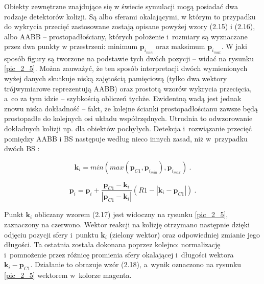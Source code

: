 				
				Obiekty zewnętrzne znajdujące się w świecie symulacji mogą posiadać dwa rodzaje detektorów kolizji. Są albo sferami okalającymi, w którym to przypadku do wykrycia przecięć zastosowane zostają opisane powyżej wzory (2.15) i (2.16), albo AABB -- prostopadłościany, których położenie i~rozmiary są wyznaczane przez dwa punkty w przestrzeni: minimum \(\mathbf{p}_{i_{min}}\) oraz maksimum \(\mathbf{p}_{i_{max}}\). W jaki sposób figury są tworzone na podstawie tych dwóch pozycji -- widać na rysunku \ref{pic_2_5}. Można zauważyć, że ten sposób interpretacji dwóch wymienionych wyżej danych skutkuje niską zajętością pamięciową (tylko dwa wektory trójwymiarowe reprezentują AABB) oraz prostotą wzorów wykrycia przecięcia, a~co za tym idzie -- szybkością obliczeń tychże. Ewidentną wadą jest jednak znowu niska dokładność -- fakt, że kolejne ścianki prostopadłościanu zawsze będą prostopadłe do kolejnych osi układu współrzędnych. Utrudnia to odwzorowanie dokładnych kolizji np. dla obiektów pochyłych. Detekcja i~rozwiązanie przecięć pomiędzy AABB i BS następuje według nieco innych zasad, niż w~przypadku dwóch BS \cite{wzory_sfera, wzory_sfera_box}:
				
				\begin{equation}
				\mathbf{k}_{i} =  min(max(\mathbf{p}_{C1}, \mathbf{p}_{i_{min}}), \mathbf{p}_{i_{max}})  \ .
				\end{equation}
				
				\begin{equation}
				\mathbf{p}_{i} = \mathbf{p}_{i} + \frac{\mathbf{p}_{C1} - \mathbf{k}_{i}}{|\mathbf{p}_{C1} - \mathbf{k}_{i}|}(R1 - |\mathbf{k}_{i} - \mathbf{p}_{C1}|) \ .
				\end{equation}
				
				
				Punkt \( \mathbf{k}_i \) obliczany wzorem (2.17) jest widoczny na rysunku \ref{pic_2_5}, zaznaczony na czerwono. Wektor reakcji na kolizję otrzymano następnie dzięki odjęciu pozycji sfery i~punktu \( \mathbf{k}_i \) (zielony wektor) oraz odpowiedniej zmianie jego długości. Ta ostatnia została dokonana poprzez kolejno: normalizację i~pomnożenie przez różnicę promienia sfery okalającej i~długości wektora \(\mathbf{k}_{i} - \mathbf{p}_{C1}\). Działanie to obrazuje wzór (2.18), a~wynik oznaczono na rysunku \ref{pic_2_5} wektorem w~kolorze magenta.
			
